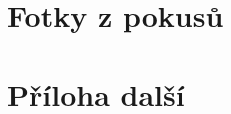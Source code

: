 \documentclass[12pt]{report}
\begin{document}
\nocite{*}
\printbibliography					%
\printglossary[title={Zkratky}]		%
\listoffigures						%
\listoftables						%

\begin{appendices}
	\chapter{Fotky z pokusů}	
	\lipsum[1]
	\chapter{Příloha další }
\end{appendices}
\end{document}
